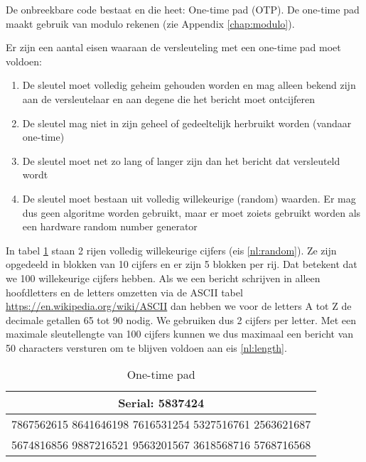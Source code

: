 De onbreekbare code bestaat en die heet: One-time pad (OTP). De one-time pad maakt gebruik van modulo rekenen (zie Appendix \ref{chap:modulo}).

Er zijn een aantal eisen waaraan de versleuteling met een one-time pad moet voldoen:
\begin{enumerate}
\item \label{nl:secret} De sleutel moet volledig geheim gehouden worden en mag alleen bekend zijn aan de versleutelaar en aan degene die het bericht moet ontcijferen
\item \label{nl:reuse} De sleutel mag niet in zijn geheel of gedeeltelijk herbruikt worden (vandaar one-time)
\item \label{nl:length} De sleutel moet net zo lang of langer zijn dan het bericht dat versleuteld wordt
\item \label{nl:random} De sleutel moet bestaan uit volledig willekeurige (random) waarden. Er mag dus geen algoritme worden gebruikt, maar er moet zoiets gebruikt worden als een hardware random number generator
\end{enumerate}

In tabel \ref{tab:onetimepad} staan 2 rijen volledig willekeurige cijfers (eis \ref{nl:random}). Ze zijn opgedeeld in blokken van 10 cijfers en er zijn 5 blokken per rij. Dat betekent dat we 100 willekeurige cijfers hebben. Als we een bericht schrijven in alleen hoofdletters en de letters omzetten via de ASCII tabel \url{https://en.wikipedia.org/wiki/ASCII} dan hebben we voor de letters A tot Z de decimale getallen 65 tot 90 nodig. We gebruiken dus 2 cijfers per letter. Met een maximale sleutellengte van 100 cijfers kunnen we dus maximaal een bericht van 50 characters versturen om te blijven voldoen aan eis \ref{nl:length}.

\begin{table}[h!]
\begin{tabular}{ | c | }
\hline
	Serial: 5837424 \\
\hline
	7867562615 8641646198 7616531254 5327516761 2563621687 \\
	5674816856 9887216521 9563201567 3618568716 5768716568 \\
\hline
\end{tabular}
\caption{One-time pad}
\label{tab:onetimepad}
\end{table}

